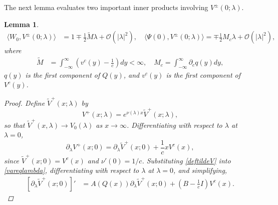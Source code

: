 \documentclass[12pt]{elsarticle}
\theoremstyle{plain}
\newtheorem{lemma}[theorem]{Lemma}
\theoremstyle{definition}
\theoremstyle{remark}
\numberwithin{theorem}{section}
\numberwithin{equation}{section}
\begin{document}
The next lemma evaluates two important inner products involving $V^\pm(0; \lambda)$.

\begin{lemma}\label{lemma:VpmPsiIP}
\begin{equation}\label{VpmIPs}
\begin{aligned}
\langle W_0, V^\pm(0; \lambda) \rangle &= 1 \mp \frac{1}{2} \tilde{M}\lambda + \mathcal{O}(|\lambda|^2), \quad
\langle \Psi(0), V^\pm(0; \lambda) \rangle = \mp \frac{1}{2} M_c \lambda + \mathcal{O}(|\lambda|^2),
\end{aligned}
\end{equation}
where
\begin{align*}
\tilde{M} &= \int_{-\infty}^{\infty} \left(v^c(y) - \frac{1}{c}\right) dy < \infty, \quad
M_c = \int_{-\infty}^\infty \partial_c q(y) dy,
\end{align*}
$q(y)$ is the first component of $Q(y)$, and $v^c(y)$ is the first component of $V^c(y)$.
\begin{proof}
Define $\tilde{V}^+(x; \lambda)$ by
\begin{equation}\label{deftildeV}
V^+(x; \lambda) = e^{\nu(\lambda)x}\tilde{V}^+(x; \lambda),
\end{equation}
so that $\tilde{V}^+(x, \lambda) \rightarrow V_0(\lambda)$ as $x \rightarrow \infty$. Differentiating with respect to $\lambda$ at $\lambda = 0$, 
\begin{equation}\label{VtildeVderiv}
\partial_\lambda V^+(x; 0)
= \partial_\lambda \tilde{V}^+(x; 0) + \frac{1}{c} x V^c(x),
\end{equation}
since $\tilde{V}^+(x; 0) = V^c(x)$ and $\nu'(0) = 1/c$. Substituting \cref{deftildeV} into \cref{vareqlambda}, differentiating with respect to $\lambda$ at $\lambda = 0$, and simplifying, 
\begin{align}\label{tildeVsolves}
[\partial_\lambda \tilde{V}^+(x; 0)]' &= A(Q(x))\partial_\lambda \tilde{V}^+(x; 0) + \left( B - \frac{1}{c}I\right) V^c(x).
\end{align}


\end{proof}
\end{lemma}
\end{document}
